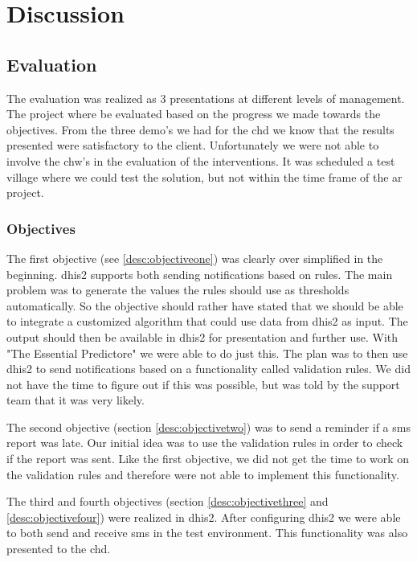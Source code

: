 \chapter{Discussion}

\section{Evaluation}
The evaluation was realized as 3 presentations at different levels of management. 
The project where be evaluated based on the progress we made towards the objectives.
From the three demo's we had for the \gls{chd} we know that the results presented were satisfactory to the client.
Unfortunately we were not able to involve the \gls{chw}'s in the evaluation of the interventions.
It was scheduled a test village where we could test the solution, but not within the time frame of the \gls{ar} project.


\subsection{Objectives}
The first objective (see \ref{desc:objectiveone}) was clearly over simplified in the beginning.
\gls{dhis2} supports both sending notifications based on rules. The main problem was to generate the values the rules should use as thresholds automatically. So the objective should rather have stated that we should be able to integrate a customized algorithm that could use data from \gls{dhis2} as input. The output should then be available in \gls{dhis2} for presentation and further use. 
With "The Essential Predictore" we were able to do just this. The plan was to then use \gls{dhis2} to send notifications based on a functionality called validation rules.
We did not have the time to figure out if this was possible, but was told by the support team that it was very likely. 

The second objective (section \ref{desc:objectivetwo}) was to send a reminder if a \gls{sms} report was late. Our initial idea was to use the validation rules in order to check if the report was sent. Like the first objective, we did not get the time to work on the validation rules and therefore were not able to implement this functionality.

The third and fourth objectives (section \ref{desc:objectivethree} and \ref{desc:objectivefour}) were realized in \gls{dhis2}. After configuring \gls{dhis2} we were able to both send and receive \gls{sms} in the test environment. This functionality was also presented to the \gls{chd}.

